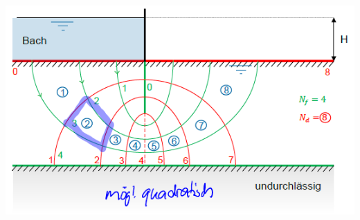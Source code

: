 \begin{minipage}{0.4\linewidth}
	\includegraphics[width=\linewidth]{images/GW17Sickernetz.PNG}
\end{minipage}





